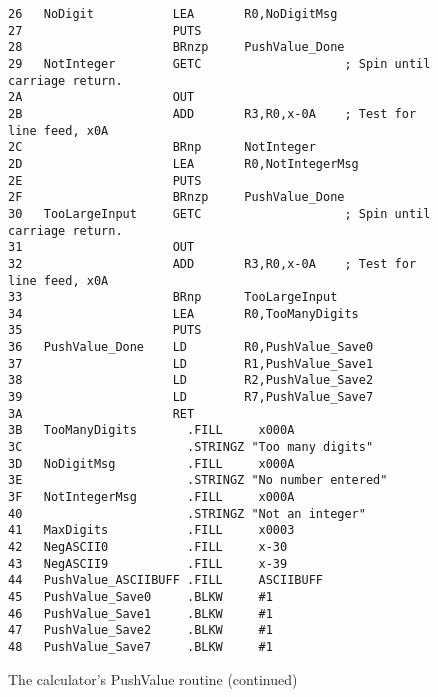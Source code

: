 \documentclass{patt}
\begin{document}
\begin{figure}[H]
\begin{minipage}{36pc}
\begin{Verbatim}[fontsize=\fontsize{9}{11}\selectfont]
26   NoDigit           LEA       R0,NoDigitMsg
27                     PUTS
28                     BRnzp     PushValue_Done
29   NotInteger        GETC                    ; Spin until carriage return.
2A                     OUT
2B                     ADD       R3,R0,x-0A    ; Test for line feed, x0A
2C                     BRnp      NotInteger
2D                     LEA       R0,NotIntegerMsg
2E                     PUTS
2F                     BRnzp     PushValue_Done
30   TooLargeInput     GETC                    ; Spin until carriage return.
31                     OUT
32                     ADD       R3,R0,x-0A    ; Test for line feed, x0A
33                     BRnp      TooLargeInput
34                     LEA       R0,TooManyDigits
35                     PUTS
36   PushValue_Done    LD        R0,PushValue_Save0
37                     LD        R1,PushValue_Save1
38                     LD        R2,PushValue_Save2
39                     LD        R7,PushValue_Save7
3A                     RET
3B   TooManyDigits       .FILL     x000A
3C                       .STRINGZ "Too many digits"
3D   NoDigitMsg          .FILL     x000A
3E                       .STRINGZ "No number entered"
3F   NotIntegerMsg       .FILL     x000A
40                       .STRINGZ "Not an integer"
41   MaxDigits           .FILL     x0003
42   NegASCII0           .FILL     x-30
43   NegASCII9           .FILL     x-39
44   PushValue_ASCIIBUFF .FILL     ASCIIBUFF
45   PushValue_Save0     .BLKW     #1
46   PushValue_Save1     .BLKW     #1
47   PushValue_Save2     .BLKW     #1
48   PushValue_Save7     .BLKW     #1
\end{Verbatim}
\caption{The calculator's PushValue routine (continued)}
\label{fig:code.pushvalue}
\end{minipage}
\end{figure}
\end{document}
